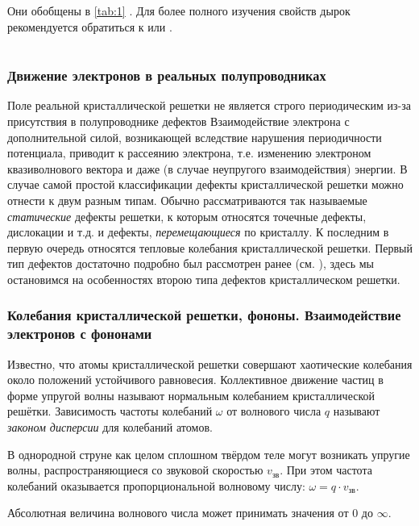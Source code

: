 Они обобщены в \ref{tab:1} \cite{lit1}. Для более полного изучения свойств дырок рекомендуется обратиться к \cite{lit1} или \cite{lit2}.
\begin{tabular}{c}
	\label{tab:1}
\end{tabular}

\subsubsection{Движение электронов  в реальных полупроводниках}

Поле реальной кристаллической решетки не является строго периодическим из-за присутствия в полупроводнике дефектов Взаимодействие электрона с дополнительной силой, возникающей вследствие нарушения периодичности потенциала, приводит к рассеянию электрона, т.е. изменению электроном квазиволнового вектора и даже (в случае неупругого взаимодействия) энергии. В случае самой простой классификации дефекты кристаллической решетки можно от­нести к двум разным типам. Обычно рассматриваются так называемые \textit{статические} дефекты решетки, к которым относятся точечные дефекты, дислокации и т.д. и дефекты, \textit{перемещающиеся} по кристаллу.  К последним в первую очередь относятся тепловые колебания кристаллической решетки. Первый тип
дефектов достаточно подробно был рассмотрен ранее (см. \cite{lit3}), здесь мы остановимся на особенностях второю типа дефектов кристаллическом решетки.

\subsubsection{Колебания кристаллической решетки, фононы. Взаимодействие электронов с фононами}

Известно, что атомы кристаллической решетки совершают хаотические
колебания около положений устойчивого равновесия. Коллективное движение
частиц в форме упругой волны называют нормальным колебанием кристаллической решётки. Зависимость частоты колебаний $\omega$ от волнового числа $q$ называют
\textit{законом дисперсии} для колебаний атомов.

В однородной струне как целом сплошном твёрдом теле могут возникать упругие волны, распространяющиеся со звуковой скоростью $v_\text{зв}$. При этом частота колебаний оказывается пропорциональной волновому числу: $\omega=q\cdot v_{\text{зв}}$.

Абсолютная величина волнового числа может принимать значения от $0$ до $\infty$.

